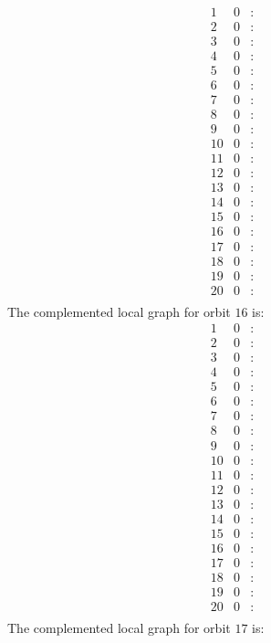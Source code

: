 \documentclass[12pt]{article}
\begin{document}
\begin{equation*}
\begin{array}{rrcl}
1&0&:&\\
2&0&:&\\
3&0&:&\\
4&0&:&\\
5&0&:&\\
6&0&:&\\
7&0&:&\\
8&0&:&\\
9&0&:&\\
10&0&:&\\
11&0&:&\\
12&0&:&\\
13&0&:&\\
14&0&:&\\
15&0&:&\\
16&0&:&\\
17&0&:&\\
18&0&:&\\
19&0&:&\\
20&0&:&\\
\end{array}
\end{equation*}
The complemented local graph for orbit $16$ is:
\begin{equation*}
\begin{array}{rrcl}
1&0&:&\\
2&0&:&\\
3&0&:&\\
4&0&:&\\
5&0&:&\\
6&0&:&\\
7&0&:&\\
8&0&:&\\
9&0&:&\\
10&0&:&\\
11&0&:&\\
12&0&:&\\
13&0&:&\\
14&0&:&\\
15&0&:&\\
16&0&:&\\
17&0&:&\\
18&0&:&\\
19&0&:&\\
20&0&:&\\
\end{array}
\end{equation*}
The complemented local graph for orbit $17$ is:
\end{document}

